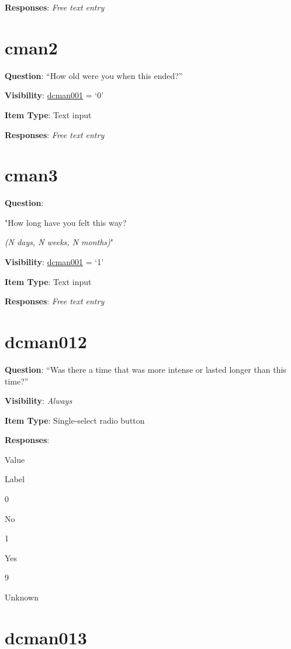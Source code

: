 \documentclass[]{book}
\begin{document}
\textbf{Responses}: \emph{Free text entry}

\hypertarget{cman2}{%
\section{cman2}\label{cman2}}

\textbf{Question}: ``How old were you when this ended?''

\textbf{Visibility}: \protect\hyperlink{dcman001}{dcman001} = `0'

\textbf{Item Type}: Text input

\textbf{Responses}: \emph{Free text entry}

\hypertarget{cman3}{%
\section{cman3}\label{cman3}}

\textbf{Question}:

"How long have you felt this way?

\emph{(N days, N weeks, N months)}"

\textbf{Visibility}: \protect\hyperlink{dcman001}{dcman001} = `1'

\textbf{Item Type}: Text input

\textbf{Responses}: \emph{Free text entry}

\hypertarget{dcman012}{%
\section{dcman012}\label{dcman012}}

\textbf{Question}: ``Was there a time that was more intense or lasted longer than this time?''

\textbf{Visibility}: \emph{Always}

\textbf{Item Type}: Single-select radio button

\textbf{Responses}:

Value

Label

0

No

1

Yes

9

Unknown

\hypertarget{dcman013}{%
\section{dcman013}\label{dcman013}}
\end{document}
